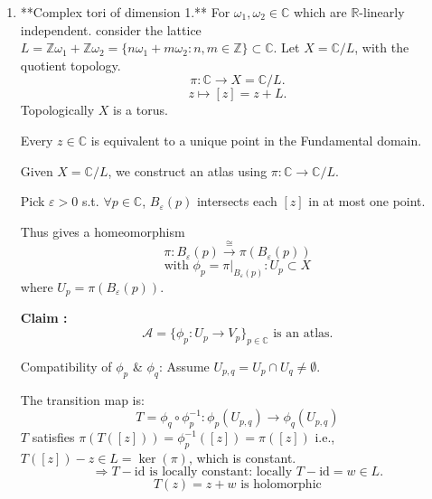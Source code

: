 \documentclass{article}
\begin{document}
\begin{enumerate}
    \item **Complex tori of dimension 1.**
    For $\omega_1, \omega_2 \in \mathbb{C}$ which are $\mathbb{R}$-linearly independent. consider the lattice $L = \mathbb{Z}\omega_1 + \mathbb{Z}\omega_2 = \{ n\omega_1 + m\omega_2 : n, m \in \mathbb{Z} \} \subset \mathbb{C}$.
    Let $X = \mathbb{C}/L$, with the quotient topology.
$$
\pi : \mathbb{C} \longrightarrow X = \mathbb{C}/L.
$$
$$
z \longmapsto [z] = z+L.
$$
Topologically $X$ is a torus.

Every $z \in \mathbb{C}$ is equivalent to a unique point in the
Fundamental domain.

\begin{center}
\end{center}

Given $X = \mathbb{C}/L$, we construct an atlas using $\pi : \mathbb{C} \to \mathbb{C}/L$.

Pick $\varepsilon > 0$ s.t. $\forall p \in \mathbb{C}$, $B_{\varepsilon}(p)$ intersects each $[z]$ in at most one point.

Thus gives a homeomorphism
$$
\pi : B_{\varepsilon}(p) \xrightarrow{\cong} \pi(B_{\varepsilon}(p))
$$
$$
\text{with } \phi_p = \pi \big|_{B_{\varepsilon}(p)} : U_p \subset X
$$
where $U_p = \pi(B_{\varepsilon}(p))$.

\textbf{Claim :}
$$
\mathcal{A} = \{ \phi_p : U_p \to V_p \}_{p \in \mathbb{C}} \text{ is an atlas.}
$$

Compatibility of $\phi_p$ \& $\phi_q$:
Assume $U_{p, q} = U_p \cap U_q \neq \emptyset$.

The transition map is:
$$
T = \phi_q \circ \phi_p^{-1} : \phi_p(U_{p, q}) \longrightarrow \phi_q(U_{p, q})
$$
$T$ satisfies $\pi(T([z])) = \phi_p^{-1}([z]) = \pi([z])$ i.e., $T([z])-z \in L = \ker(\pi)$, which is constant.
$$
\Rightarrow T - \mathrm{id} \text{ is locally constant: locally } T - \mathrm{id} = w \in L.
$$
$$
T(z) = z + w \text{ is holomorphic}
$$
\end{enumerate}
\end{document}
